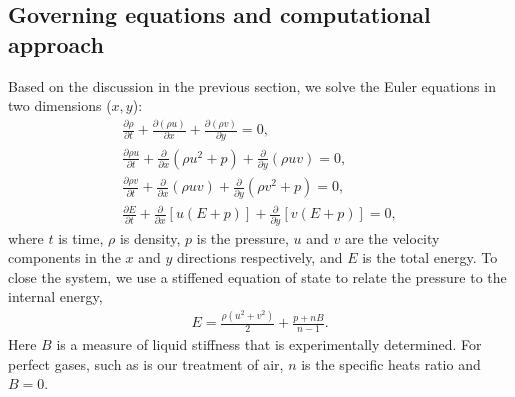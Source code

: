 \documentclass{jfm}%
\begin{document}
\subsection{Governing equations and computational approach}
\label{subsec:governing_equations}
Based on the discussion in the previous section, we solve the Euler
equations in two dimensions ($x,y$):
% 
\begin{subequations} \label{eq:euler}%
  \begin{align}%
    \frac{\partial \rho}{\partial t} + \frac{\partial \left(\rho u\right)}{\partial x} + \frac{\partial \left(\rho v\right)}{\partial y} = 0,\\
    \frac{\partial \rho u}{\partial t} + \frac{\partial}{\partial x}\left( \rho u^2+p\right)  + \frac{\partial}{\partial y}\left( \rho uv\right) = 0,\\
    \frac{\partial \rho v}{\partial t} + \frac{\partial}{\partial x}\left( \rho uv\right)  + \frac{\partial}{\partial y}\left( \rho v^2+p\right) = 0,\\
    \frac{\partial E}{\partial t} + \frac{\partial}{\partial x}\left[u\left(E+p\right)\right] + \frac{\partial}{\partial y}\left[v\left(E+p\right)\right] = 0,
  \end{align}%
\end{subequations}%
% 
where $t$ is time, $\rho$ is density, $p$ is the pressure, $u$ and $v$
are the velocity components in the $x$ and $y$ directions
respectively, and $E$ is the total energy. To close the system, we use
a stiffened equation of state to relate the pressure to the internal
energy,
% 
\begin{align} \label{eq:stiffened_eos}%
  E=\frac{\rho\left(u^2+v^2\right)}{2} + \frac{p+n B}{n-1}.
\end{align}
% 
Here $B$ is a measure of liquid stiffness that is experimentally
determined. For perfect gases, such as is our
treatment of air, $n$ is the specific heats ratio and $B=0$.
\end{document}
